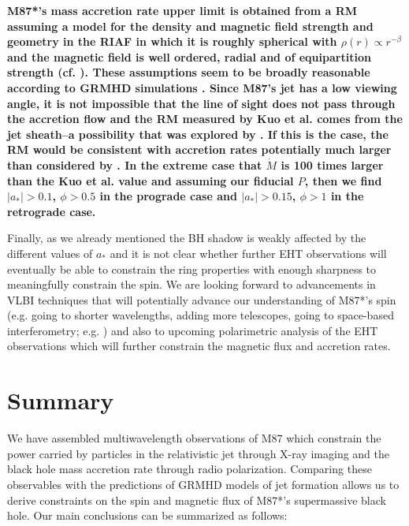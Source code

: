 \documentclass[twocolumn, linenumbers]{aastex62} %
\begin{document}
\textbf{M87*'s mass accretion rate upper limit is obtained from a RM assuming a model for the density and magnetic field strength and geometry in the RIAF in which it is roughly spherical with $\rho(r) \propto r^{-\beta}$ and the magnetic field is well ordered, radial and of equipartition strength (cf. \citealt{Marrone2006,Kuo2014}). These assumptions seem to be broadly reasonable according to GRMHD simulations . 
Since M87's jet has a low viewing angle, it is not impossible that the line of sight does not pass through the accretion flow and the RM measured by Kuo et al. comes from the jet sheath--a possibility that was explored by \cite{Moscibrodzka2017a}. If this is the case, the RM would be consistent with accretion rates potentially much larger than considered by \cite{Kuo2014}. In the extreme case that $\dot{M}$ is 100 times larger than the Kuo et al. value and assuming our fiducial $P$, then we find $|a_*| > 0.1$, $\phi > 0.5$ in the prograde case and  $|a_*| > 0.15$, $\phi > 1$ in the retrograde case. }


Finally, as we already mentioned the BH shadow is weakly affected by the different values of $a_*$ and it is not clear whether further EHT observations will eventually be able to constrain the ring properties with enough sharpness to meaningfully constrain the spin. We are looking forward to advancements in VLBI techniques that will potentially advance our understanding of M87*'s spin (e.g. going to shorter wavelengths, adding more telescopes, going to space-based interferometry; e.g. \citealt{Roelofs2019}) and also to upcoming polarimetric analysis of the EHT observations which will further constrain the magnetic flux and accretion rates.




\section{Summary}	\label{sec:summary}

We have assembled multiwavelength observations of M87 which constrain the power carried by particles in the relativistic jet through X-ray imaging and the black hole mass accretion rate through radio polarization. Comparing these observables with the predictions of GRMHD models of jet formation allows us to derive constraints on the spin and magnetic flux of M87*'s supermassive black hole. Our main conclusions can be summarized as follows:
\end{document}
